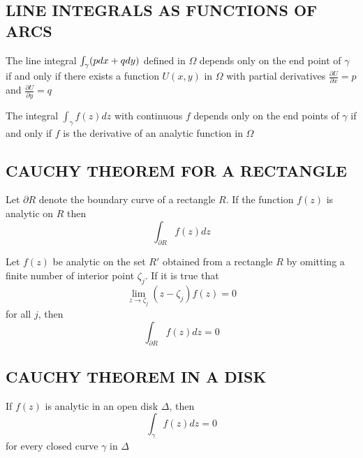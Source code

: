 \documentclass{report}
\begin{document}
\subsection{LINE INTEGRALS AS FUNCTIONS OF ARCS}

\begin{theorem}
    The line integral $\int_\gamma (pdx + qdy)$ defined in $\Omega$ depends only on the end point of $\gamma$ if and only if there exists a function $U(x, y)$ in $\Omega$ with partial derivatives $\frac{\partial U}{\partial x} = p$ and $\frac{\partial U}{\partial y} = q$
\end{theorem}

\begin{theorem}
    The integral $\int_\gamma f(z)dz$ with continuous $f$ depends only on the end points of $\gamma$ if and only if $f$ is the derivative of an analytic function in $\Omega$
\end{theorem}

\subsection{CAUCHY THEOREM FOR A RECTANGLE}

\begin{theorem}
    Let $\partial R$ denote the boundary curve of a rectangle $R$. If the function $f(z)$ is analytic on $R$ then
    \[
        \int_{\partial R} f(z) dz
    \]
\end{theorem}

\begin{theorem}
    Let $f(z)$ be analytic on the set $R'$ obtained from a rectangle $R$ by omitting a finite number of interior point $\zeta_j$. If it is true that
    \[
        \lim_{z \to \zeta_j} (z -\zeta_j) f(z) = 0
    \]
    for all $j$, then
    \[
        \int_{\partial R} f(z) dz = 0
    \]
\end{theorem}

\subsection{CAUCHY THEOREM IN A DISK}

\begin{theorem}
    If $f(z)$ is analytic in an open disk $\Delta$, then 
    \[
        \int_{\gamma} f(z) dz = 0
    \]
    for every closed curve $\gamma$ in $\Delta$
\end{theorem}
\end{document}
